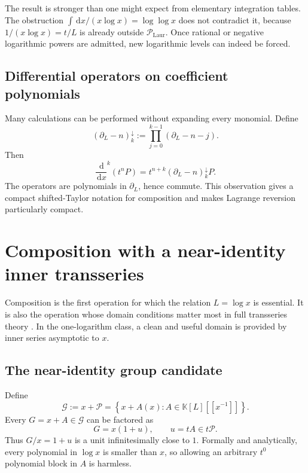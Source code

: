 \documentclass[11pt]{article}
\theoremstyle{pltheorem}
\newcommand{\K}{\mathbb K}
\newcommand{\PL}{\mathscr P}
\newcommand{\PLL}{\mathscr P_{\mathrm{Laur}}}
\newcommand{\Gnear}{\mathcal G}
\newcommand{\dd}{\,\mathrm d}
\newcommand{\set}[1]{\left\{#1\right\}}
\newcommand{\D}{\frac{\dd}{\dd x}}
\begin{document}
The result is stronger than one might expect from elementary integration tables.  The obstruction \(\int \dd x/(x\log x)=\log\log x\) does not contradict it, because \(1/(x\log x)=t/L\) is already outside \(\PLL\).  Once rational or negative logarithmic powers are admitted, new logarithmic levels can indeed be forced.

\subsection{Differential operators on coefficient polynomials}

Many calculations can be performed without expanding every monomial.  Define
\begin{equation}\label{eq:falling-D-operator}
 (\partial_L-n)_{k}^{\downarrow}
 :=\prod_{j=0}^{k-1}(\partial_L-n-j).
\end{equation}
Then
\[
 \D^k(t^nP)=t^{n+k}(\partial_L-n)_{k}^{\downarrow}P.
\]
The operators are polynomials in \(\partial_L\), hence commute.  This observation gives a compact shifted-Taylor notation for composition and makes Lagrange reversion particularly compact.

\section{Composition with a near-identity inner transseries}
\label{sec:composition}

Composition is the first operation for which the relation \(L=\log x\) is essential.  It is also the operation whose domain conditions matter most in full transseries theory \cite{edgar-composition,vanderhoeven-book}.  In the one-logarithm class, a clean and useful domain is provided by inner series asymptotic to \(x\).

\subsection{The near-identity group candidate}

Define
\begin{equation}\label{eq:Gnear-def}
 \Gnear:=x+\PL
 =\set{x+A(x):A\in\K[L][[x^{-1}]]}.
\end{equation}
Every \(G=x+A\in\Gnear\) can be factored as
\begin{equation}\label{eq:G-factor}
 G=x(1+u),
 \qquad
 u=tA\in t\PL.
\end{equation}
Thus \(G/x=1+u\) is a unit infinitesimally close to \(1\).  Formally and analytically, every polynomial in \(\log x\) is smaller than \(x\), so allowing an arbitrary \(t^0\) polynomial block in \(A\) is harmless.
\end{document}
